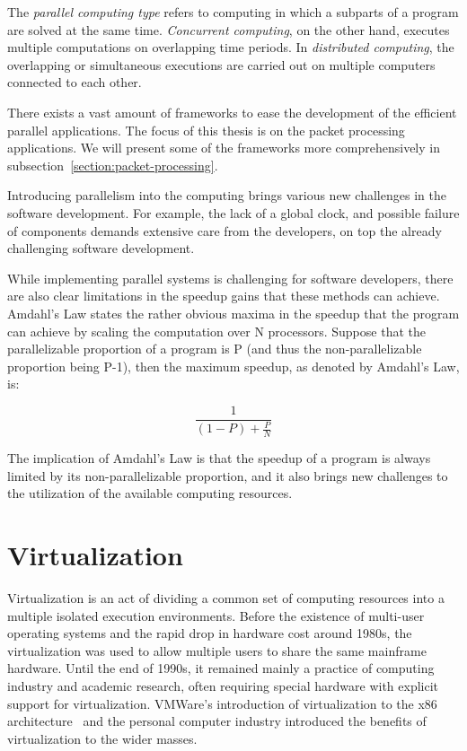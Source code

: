 
The \emph{parallel computing type} refers to computing in which a subparts of a program are solved at the same time. \emph{Concurrent computing}, on the other hand, executes multiple computations on overlapping time periods. In \emph{distributed computing}, the overlapping or simultaneous executions are carried out on multiple computers connected to each other.


There exists a vast amount of frameworks to ease the development of the efficient parallel applications. The focus of this thesis is on the packet processing applications. We will present some of the frameworks more comprehensively in subsection~\ref{section:packet-processing}.

Introducing parallelism into the computing brings various new challenges in the software development. For example, the lack of a global clock, and possible failure of components demands extensive care from the developers, on top the already challenging software development.

While implementing parallel systems is challenging for software developers, there are also clear limitations in the speedup gains that these methods can achieve. Amdahl's Law states the rather obvious maxima in the speedup that the program can achieve by scaling the computation over N processors. Suppose that the parallelizable proportion of a program is P (and thus the non-parallelizable proportion being P-1), then the maximum speedup, as denoted by Amdahl's Law, is:~\cite{Amdahl:1967:VSP}

\begin{equation*}
  \frac{1}{(1-P) + \frac{P}{N}}
\end{equation*}

The implication of Amdahl's Law is that the speedup of a program is always limited by its non-parallelizable proportion, and it also brings new challenges to the utilization of the available computing resources.

\section{Virtualization}
\label{section:virtualization}
Virtualization is an act of dividing a common set of computing resources into a multiple isolated execution environments. Before the existence of multi-user operating systems and the rapid drop in hardware cost around 1980s, the virtualization was used to allow multiple users to share the same mainframe hardware. Until the end of 1990s, it remained mainly a practice of computing industry and academic research, often requiring special hardware with explicit support for virtualization. VMWare's introduction of virtualization to the x86 architecture~\cite{Walters:1999:VVP} and the personal computer industry introduced the benefits of virtualization to the wider masses.~\cite{Bugnion:2012:BVX}

